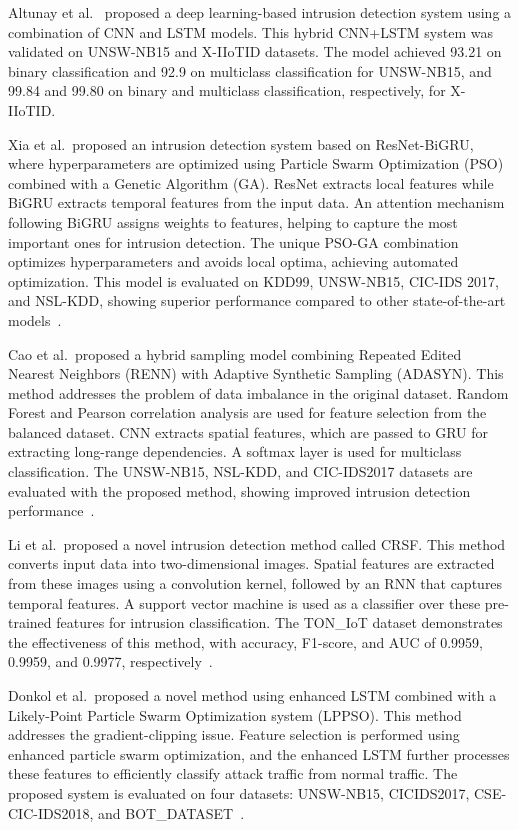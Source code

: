 \documentclass[a4paper,fleqn]{cas-sc}
\begin{document}
Altunay et al.~\cite{bib13} proposed a deep learning-based intrusion detection system using a combination of CNN and LSTM models. This hybrid CNN+LSTM system was validated on UNSW-NB15 and X-IIoTID datasets. The model achieved 93.21 on binary classification and 92.9 on multiclass classification for UNSW-NB15, and 99.84 and 99.80 on binary and multiclass classification, respectively, for X-IIoTID.

Xia et al.\ proposed an intrusion detection system based on ResNet-BiGRU, where hyperparameters are optimized using Particle Swarm Optimization (PSO) combined with a Genetic Algorithm (GA). ResNet extracts local features while BiGRU extracts temporal features from the input data. An attention mechanism following BiGRU assigns weights to features, helping to capture the most important ones for intrusion detection. The unique PSO-GA combination optimizes hyperparameters and avoids local optima, achieving automated optimization. This model is evaluated on KDD99, UNSW-NB15, CIC-IDS 2017, and NSL-KDD, showing superior performance compared to other state-of-the-art models~\cite{bib14}.

Cao et al.\ proposed a hybrid sampling model combining Repeated Edited Nearest Neighbors (RENN) with Adaptive Synthetic Sampling (ADASYN). This method addresses the problem of data imbalance in the original dataset. Random Forest and Pearson correlation analysis are used for feature selection from the balanced dataset. CNN extracts spatial features, which are passed to GRU for extracting long-range dependencies. A softmax layer is used for multiclass classification. The UNSW-NB15, NSL-KDD, and CIC-IDS2017 datasets are evaluated with the proposed method, showing improved intrusion detection performance~\cite{bib15}.

Li et al.\ proposed a novel intrusion detection method called CRSF. This method converts input data into two-dimensional images. Spatial features are extracted from these images using a convolution kernel, followed by an RNN that captures temporal features. A support vector machine is used as a classifier over these pre-trained features for intrusion classification. The TON\_IoT dataset demonstrates the effectiveness of this method, with accuracy, F1-score, and AUC of 0.9959, 0.9959, and 0.9977, respectively~\cite{bib16}.

Donkol et al.\ proposed a novel method using enhanced LSTM combined with a Likely-Point Particle Swarm Optimization system (LPPSO). This method addresses the gradient-clipping issue. Feature selection is performed using enhanced particle swarm optimization, and the enhanced LSTM further processes these features to efficiently classify attack traffic from normal traffic. The proposed system is evaluated on four datasets: UNSW-NB15, CICIDS2017, CSE-CIC-IDS2018, and BOT\_DATASET~\cite{bib17}.
\end{document}
